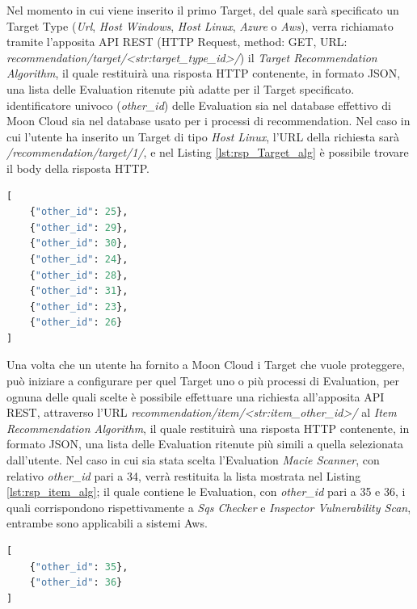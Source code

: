 Nel momento in cui viene inserito il primo Target, del quale sarà specificato un Target Type (\textit{Url}, \textit{Host Windows}, 
\textit{Host Linux}, \textit{Azure} o \textit{Aws}), verra richiamato tramite l'apposita API REST (HTTP Request, method: GET, URL: 
\textit{recommendation/target/<str:target\_type\_id>/}) il \textit{Target Recommendation Algorithm}, il quale restituirà una 
risposta HTTP contenente, in formato JSON, una lista delle Evaluation ritenute più adatte per il Target specificato. 
identificatore univoco (\textit{other\_id}) delle Evaluation sia nel database effettivo di Moon Cloud sia nel database usato 
per i processi di recommendation. 
Nel caso in cui l'utente ha inserito un Target di tipo \textit{Host Linux}, l'URL della richiesta sarà 
\textit{/recommendation/target/1/}, e nel Listing \ref{lst:rsp_Target_alg} è possibile trovare il body della risposta HTTP.
\lstset{style=python_code_style}
\begin{lstlisting}[language=Python, label=lst:rsp_Target_alg, caption={Esempio del body della risposta HTTP alla chiamata del 
    \textit{Target Recommendation Algorithm}}]
[
    {"other_id": 25},
    {"other_id": 29},
    {"other_id": 30},
    {"other_id": 24},
    {"other_id": 28},
    {"other_id": 31},
    {"other_id": 23},
    {"other_id": 26}
]
\end{lstlisting}
Una volta che un utente ha fornito a Moon Cloud i Target che vuole proteggere, può iniziare a configurare per quel Target uno 
o più processi di Evaluation, per ognuna delle quali scelte è possibile effettuare una richiesta all'apposita API REST, 
attraverso l'URL \textit{recommendation/item/<str:item\_other\_id>/} al \textit{Item Recommendation Algorithm}, il quale 
restituirà una risposta HTTP contenente, in formato JSON, una lista delle Evaluation ritenute più simili a quella selezionata 
dall'utente. Nel caso in cui sia stata scelta l'Evaluation \textit{Macie Scanner}, con relativo \textit{other\_id} pari a 34, 
verrà restituita la lista mostrata nel Listing \ref{lst:rsp_item_alg}; il quale 
contiene le Evaluation, con \textit{other\_id} pari a 35 e 36, i quali corrispondono rispettivamente a \textit{Sqs Checker} 
e \textit{Inspector Vulnerability Scan}, entrambe sono applicabili a sistemi Aws.
\begin{lstlisting}[language=Python, label=lst:rsp_item_alg, caption={Esempio del body della risposta HTTP alla chiamata del 
    \textit{Item Recommendation Algorithm}}]
[
    {"other_id": 35},
    {"other_id": 36}
]
\end{lstlisting}
